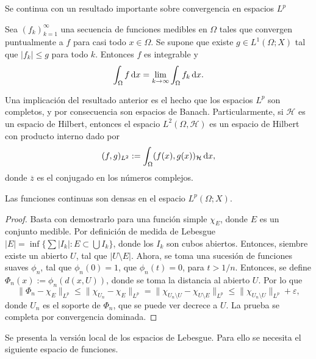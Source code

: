 Se continua con un resultado importante sobre convergencia en 
espacios $L^p$
\begin{theorem}
    Sea $(f_k)_{k=1}^\infty$ una secuencia de funciones medibles en $\Omega$ 
    tales que convergen puntualmente a $f$ para casi todo $x\in\Omega$. Se supone
    que existe $g\in L^1(\Omega;X)$ tal que $|f_k|\leq g$ para todo $k$. Entonces
    $f$ es integrable y 
    \begin{equation*}
        \int_\Omega f \mathop{}\!\mathrm{d} x = \lim_{k\rightarrow\infty} \int_\Omega 
        f_k \mathop{}\!\mathrm{d} x.
    \end{equation*}
\end{theorem}
\begin{remark}
    Una implicación del resultado anterior es el hecho que los espacios $L^p$ son 
    completos, y por consecuencia son espacios de Banach. Particularmente, si $\mathcal{H}$ es un espacio de Hilbert, entonces el 
    espacio $L^2(\Omega,\mathcal{H})$ es un espacio de Hilbert con producto interno dado por
    \begin{equation*}
        (f, g)_{L^2} := \int_\Omega (f(x), g(x))_{\mathcal{H}}\mathop{}\!\mathrm{d} x,
    \end{equation*}
    donde $\overline{z}$ es el conjugado en los números complejos.
\end{remark}
\begin{theorem}
	Las funciones continuas son densas en el espacio $L^p(\Omega;X)$.
\end{theorem}
\begin{proof}
	Basta con demostrarlo para una función simple $\chi_E$, donde $E$ es un conjunto medible. Por definición de medida de Lebesgue 
	$|E| = \inf\{\sum |I_k| : E \subset \bigcup I_k\}$, donde los $I_k$ son cubos abiertos. Entonces, siembre existe un abierto $U$, tal que $|U\setminus E|$. Ahora, se toma una sucesión de funciones suaves $\phi_n$, tal que $\phi_n(0)=1$, que $\phi_n(t)=0$, para $t>1/n$. Entonces, se define $\Phi_n(x) := \phi_n(d(x, U))$, donde se toma la distancia al abierto $U$. Por lo que 
	\begin{equation*}
		\|\Phi_n - \chi_E\|_{L^p} \leq \|\chi_{U_n} - \chi_E\|_{L^p} = \|\chi_{U_n\setminus U} - \chi_{U\setminus E}\|_{L^p} \leq \|\chi_{U_n\setminus U} \|_{L^p} +\varepsilon,
	\end{equation*}
	donde $U_n$ es el soporte de $\Phi_n$, que se puede ver decrece a $U$. La prueba se completa por convergencia dominada.
\end{proof}
Se presenta la versión local de los espacios de Lebesgue. Para ello se necesita el siguiente espacio de funciones.
